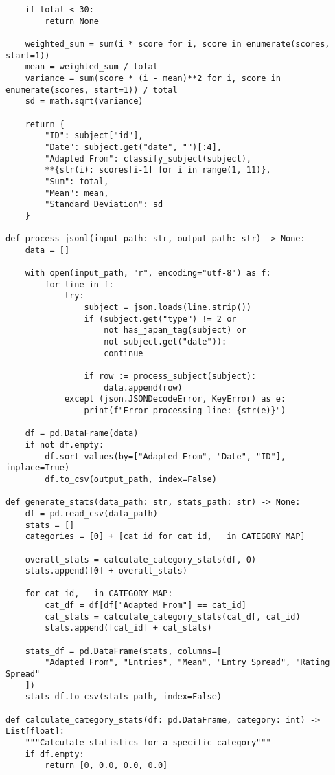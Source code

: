 \documentclass{article}
\begin{document}
\begin{CJK*}{UTF8}{gbsn}
\begin{CJK*}{UTF8}{gbsn}
\begin{verbatim}
    if total < 30:
        return None

    weighted_sum = sum(i * score for i, score in enumerate(scores, start=1))
    mean = weighted_sum / total
    variance = sum(score * (i - mean)**2 for i, score in enumerate(scores, start=1)) / total
    sd = math.sqrt(variance)

    return {
        "ID": subject["id"],
        "Date": subject.get("date", "")[:4],
        "Adapted From": classify_subject(subject),
        **{str(i): scores[i-1] for i in range(1, 11)},
        "Sum": total,
        "Mean": mean,
        "Standard Deviation": sd
    }

def process_jsonl(input_path: str, output_path: str) -> None:
    data = []
    
    with open(input_path, "r", encoding="utf-8") as f:
        for line in f:
            try:
                subject = json.loads(line.strip())
                if (subject.get("type") != 2 or 
                    not has_japan_tag(subject) or 
                    not subject.get("date")):
                    continue
                
                if row := process_subject(subject):
                    data.append(row)
            except (json.JSONDecodeError, KeyError) as e:
                print(f"Error processing line: {str(e)}")
    
    df = pd.DataFrame(data)
    if not df.empty:
        df.sort_values(by=["Adapted From", "Date", "ID"], inplace=True)
        df.to_csv(output_path, index=False)

def generate_stats(data_path: str, stats_path: str) -> None:
    df = pd.read_csv(data_path)
    stats = []
    categories = [0] + [cat_id for cat_id, _ in CATEGORY_MAP]
    
    overall_stats = calculate_category_stats(df, 0)
    stats.append([0] + overall_stats)
    
    for cat_id, _ in CATEGORY_MAP:
        cat_df = df[df["Adapted From"] == cat_id]
        cat_stats = calculate_category_stats(cat_df, cat_id)
        stats.append([cat_id] + cat_stats)
    
    stats_df = pd.DataFrame(stats, columns=[
        "Adapted From", "Entries", "Mean", "Entry Spread", "Rating Spread"
    ])
    stats_df.to_csv(stats_path, index=False)

def calculate_category_stats(df: pd.DataFrame, category: int) -> List[float]:
    """Calculate statistics for a specific category"""
    if df.empty:
        return [0, 0.0, 0.0, 0.0]
    

\end{verbatim}
\end{CJK*}
\end{CJK*}
\end{document}
